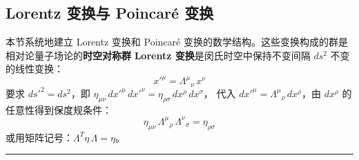 \subsection{Lorentz 变换与 Poincar\'e 变换}

本节系统地建立 Lorentz 变换和 Poincar\'e 变换的数学结构。这些变换构成的群是
相对论量子场论的\textbf{时空对称群}
\textbf{Lorentz 变换}是闵氏时空中保持不变间隔 $ds^2$ 不变的线性变换：
\begin{equation}\label{eq:Lorentz-def}
  x'^\mu = \Lambda^\mu{}_\nu\, x^\nu
\end{equation}
要求 $ds'^2 = ds^2$，即 $\eta_{\mu\nu}\,dx'^\mu\,dx'^\nu = \eta_{\rho\sigma}\,dx^\rho\,dx^\sigma$，
代入 $dx'^\mu = \Lambda^\mu{}_\rho\,dx^\rho$，由 $dx^\rho$ 的任意性得到保度规条件：
\begin{equation}\label{eq:metric-preserve}
  \eta_{\mu\nu}\,\Lambda^\mu{}_\rho\,\Lambda^\nu{}_\sigma = \eta_{\rho\sigma}
\end{equation}或用矩阵记号：$\Lambda^T \eta\,\Lambda = \eta$。
\vspace{2ex}\hrule
\vspace{2ex}
